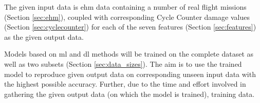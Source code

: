 The given input data is \ac{ehm} data containing a number of real flight missions (Section \ref{sec:ehm}), coupled with corresponding Cycle Counter damage values (Section \ref{sec:cyclecounter}) for each of the seven features (Section \ref{sec:features}) as the given output data.

Models based on \ac{ml} and \ac{dl} methods will be trained on the complete dataset as well as two subsets (Section \ref{sec:data_sizes}). The aim is to use the trained model to reproduce given output data on corresponding unseen input data with the highest possible accuracy. Further, due to the time and effort involved in gathering the given output data (on which the model is trained), training data.